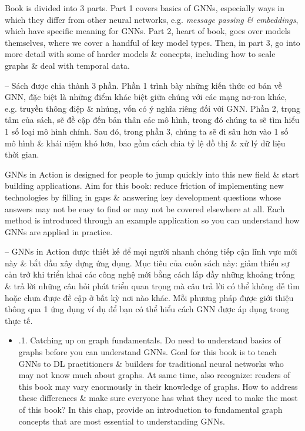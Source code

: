 \documentclass{article}
\begin{document}
\begin{itemize}
\begin{itemize}
        Book is divided into 3 parts. Part 1 covers basics of GNNs, especially ways in which they differ from other neural networks, e.g. {\it message passing \& embeddings}, which have specific meaning for GNNs. Part 2, heart of book, goes over models themselves, where we cover a handful of key model types. Then, in part 3, go into more detail with some of harder models \& concepts, including how to scale graphs \& deal with temporal data.

        -- Sách được chia thành 3 phần. Phần 1 trình bày những kiến thức cơ bản về GNN, đặc biệt là những điểm khác biệt giữa chúng với các mạng nơ-ron khác, e.g. {truyền thông điệp \& nhúng}, vốn có ý nghĩa riêng đối với GNN. Phần 2, trọng tâm của sách, sẽ đề cập đến bản thân các mô hình, trong đó chúng ta sẽ tìm hiểu 1 số loại mô hình chính. Sau đó, trong phần 3, chúng ta sẽ đi sâu hơn vào 1 số mô hình \& khái niệm khó hơn, bao gồm cách chia tỷ lệ đồ thị \& xử lý dữ liệu thời gian.

        GNNs in Action is designed for people to jump quickly into this new field \& start building applications. Aim for this book: reduce friction of implementing new technologies by filling in gaps \& answering key development questions whose answers may not be easy to find or may not be covered elsewhere at all. Each method is introduced through an example application so you can understand how GNNs are applied in practice.

        -- GNNs in Action được thiết kế để mọi người nhanh chóng tiếp cận lĩnh vực mới này \& bắt đầu xây dựng ứng dụng. Mục tiêu của cuốn sách này: giảm thiểu sự cản trở khi triển khai các công nghệ mới bằng cách lấp đầy những khoảng trống \& trả lời những câu hỏi phát triển quan trọng mà câu trả lời có thể không dễ tìm hoặc chưa được đề cập ở bất kỳ nơi nào khác. Mỗi phương pháp được giới thiệu thông qua 1 ứng dụng ví dụ để bạn có thể hiểu cách GNN được áp dụng trong thực tế.
        \begin{itemize}
            \item {.1. Catching up on graph fundamentals.} Do need to understand basics of graphs before you can understand GNNs. Goal for this book is to teach GNNs to DL practitioners \& builders for traditional neural networks who may not know much about graphs. At same time, also recognize: readers of this book may vary enormously in their knowledge of graphs. How to address these differences \& make sure everyone has what they need to make the most of this book? In this chap, provide an introduction to fundamental graph concepts that are most essential to understanding GNNs.


\end{itemize}
\end{itemize}
\end{itemize}
\end{document}
